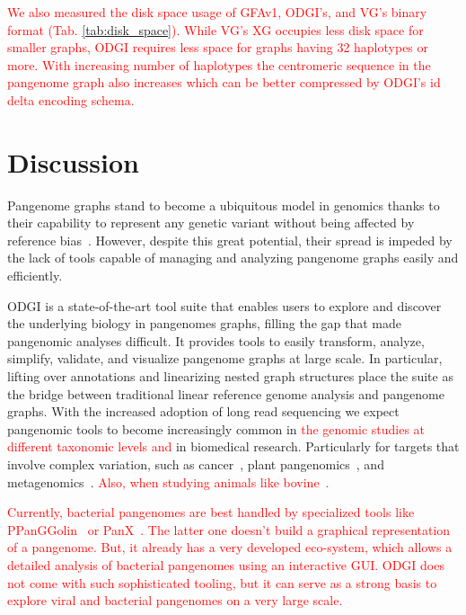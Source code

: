 \documentclass{bioinfo}
\newcommand{\REVIEWED}[1]{{\textcolor{Red}{#1}}}
\begin{document}
\REVIEWED{We also measured the disk space usage of GFAv1, ODGI's, and VG's binary format (Tab. \ref{tab:disk_space}). While VG's XG occupies less disk space for smaller graphs, ODGI requires less space for graphs having 32 haplotypes or more. With increasing number of haplotypes the centromeric sequence in the pangenome graph also increases which can be better compressed by ODGI's id delta encoding schema. }





%




\section{Discussion}
Pangenome graphs stand to become a ubiquitous model in genomics thanks to their capability to represent any genetic variant without being affected by reference bias~\citep{Eizenga_2020}.
However, despite this great potential, their spread is impeded by the lack of tools capable of managing and analyzing pangenome graphs easily and efficiently.

ODGI is a state-of-the-art tool suite that enables users to explore and discover the underlying biology in pangenomes graphs, filling the gap that made pangenomic analyses difficult.
It provides tools to easily transform, analyze, simplify, validate, and visualize pangenome graphs at large scale.
In particular, lifting over annotations and linearizing nested graph structures place the suite as the bridge between traditional linear reference genome analysis and pangenome graphs.
With the increased adoption of long read sequencing we expect pangenomic tools to become increasingly common in \REVIEWED{the genomic studies at different taxonomic levels and} in biomedical research.
Particularly for targets that involve complex variation, such as cancer\REVIEWED{~\citep{CompPan2016}}, plant pangenomics\REVIEWED{~\citep{Bayer2020, Liu2020, Qin2021, Li2022}}, and metagenomics\REVIEWED{~\citep{Zhong2021}}. \REVIEWED{Also, when studying animals like bovine~\citep{Leonard2021, Talenti2022, BPC}.} 

\REVIEWED{Currently, bacterial pangenomes are best handled by specialized tools like PPanGGolin~\citep{Gautreau2020} or PanX~\citep{Wei2017}. The latter one doesn't build a graphical representation of  a pangenome. But, it already has a very developed eco-system, which allows a detailed analysis of bacterial pangenomes using an interactive GUI. ODGI does not come with such sophisticated tooling, but it can serve as a strong basis to explore viral and bacterial pangenomes on a very large scale.}
\end{document}
